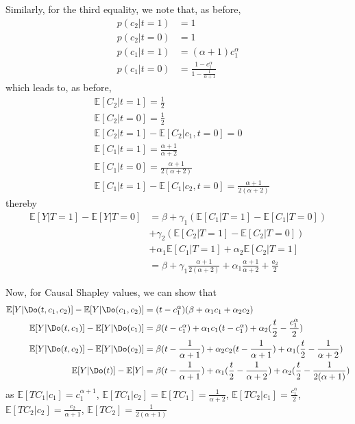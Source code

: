 Similarly, for the third equality, we note that, as before,
\begin{align*}
    p(c_2|t=1) &= 1 \\
    p(c_2|t=0) &= 1 \\
    p(c_1|t=1) &= (\alpha+1)c_1^\alpha \\
    p(c_1|t=0) &= \frac{1 - c_1^\alpha}{1 - \frac{1}{\alpha+1}}
\end{align*}
which leads to, as before,
\begin{align*}
&\mathbb{E}[C_2|t=1] = \frac{1}{2} \\
&\mathbb{E}[C_2|t=0] = \frac{1}{2} \\
&\mathbb{E}[C_2|t=1] - \mathbb{E}[C_2|c_1,t=0] = 0 \\
&\mathbb{E}[C_1|t=1] = \frac{\alpha+1}{\alpha+2} \\
&\mathbb{E}[C_1|t=0] = \frac{\alpha+1}{2(\alpha+2)} \\
&\mathbb{E}[C_1|t=1] - \mathbb{E}[C_1|c_2,t=0] = \frac{\alpha+1}{2(\alpha+2)}
\end{align*}
thereby
\begin{align*}
    \mathbb{E}[Y|T=1] - \mathbb{E}[Y|T=0] &= \beta + \gamma_1 (\mathbb{E}[C_1|T=1] - \mathbb{E}[C_1|T=0] ) \\
    &+ \gamma_2(\mathbb{E}[C_2|T=1] - \mathbb{E}[C_2|T=0]) \\
    &+ \alpha_1\mathbb{E}[C_1|T=1] + \alpha_2\mathbb{E}[C_2|T=1]  \\
    &= \beta + \gamma_1\frac{\alpha + 1}{2(\alpha + 2)} + \alpha_1\frac{\alpha+1}{\alpha+2} + \frac{a_2}{2}
\end{align*}

Now, for Causal Shapley values, we can show that
\begin{align*}
    \mathbb{E}[Y|\Do(t,c_1,c_2)] - \mathbb{E}[Y|\Do(c_1,c_2)] &= (t - c_1^\alpha )(\beta + \alpha_1c_1 + \alpha_2c_2) \\
    \mathbb{E}[Y|\Do(t,c_1)] - \mathbb{E}[Y|\Do(c_1)] &= \beta (t - c_1^\alpha) + \alpha_1c_1(t - c_1^\alpha) + \alpha_2(\frac{t}{2} - \frac{c_1^\alpha}{2}) \\
    \mathbb{E}[Y|\Do(t,c_2)] - \mathbb{E}[Y|\Do(c_2)] &= \beta (t - \frac{1}{\alpha+1}) + \alpha_2c_2(t - \frac{1}{\alpha+1}) + \alpha_1(\frac{t}{2} - \frac{1}{\alpha+2}) \\
    \mathbb{E}[Y|\Do(t)] - \mathbb{E}[Y] &= \beta(t - \frac{1}{\alpha+1}) + \alpha_1(\frac{t}{2} - \frac{1}{\alpha+2}) + \alpha_2(\frac{t}{2} - \frac{1}{2(\alpha+1)}) \\
\end{align*}
as $\mathbb{E}[TC_1|c_1] = c_1^{\alpha+1}$, $\mathbb{E}[TC_1|c_2] = \mathbb{E}[TC_1] = \frac{1}{\alpha+2}$, $\mathbb{E}[TC_2|c_1] = \frac{c_1^\alpha}{2}$, $\mathbb{E}[TC_2|c_2] = \frac{c_2}{\alpha+1}$, $\mathbb{E}[TC_2] = \frac{1}{2(\alpha+1)}$




